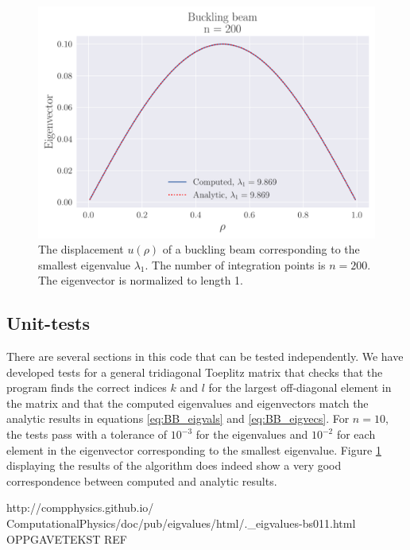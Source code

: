 \documentclass[reprint,english,notitlepage,nofootinbib]{revtex4-1}  %
\begin{document}
\begin{figure}[h]
	\centering
	\includegraphics[width=\linewidth]{../output/BB_200_0.pdf}
	\caption{The displacement $u(\rho)$ of a buckling beam corresponding to the smallest eigenvalue $\lambda_1$. The number of integration points is $n = 200$. The eigenvector is normalized to length 1.}
  \label{fig:BB200}
\end{figure}


\subsection{Unit-tests}

There are several sections in this code that can be tested independently. We have developed tests for a general tridiagonal Toeplitz matrix that checks that the program finds the correct indices $k$ and $l$ for the largest off-diagonal element in the matrix and that the computed eigenvalues and eigenvectors match the analytic results in equations \ref{eq:BB_eigvals} and \ref{eq:BB_eigvecs}. For $n = 10$, the tests pass with a tolerance of $10^{-3}$ for the eigenvalues and $10^{-2}$ for each element in the eigenvector corresponding to the smallest eigenvalue. Figure \ref{fig:BB200} displaying the results of the algorithm does indeed show a very good correspondence between computed and analytic results.


\onecolumngrid
\begin{thebibliography}{}
 http://compphysics.github.io/
ComputationalPhysics/doc/pub/eigvalues/html/.\_eigvalues-bs011.html
 OPPGAVETEKST REF

\end{thebibliography}
\end{document}
